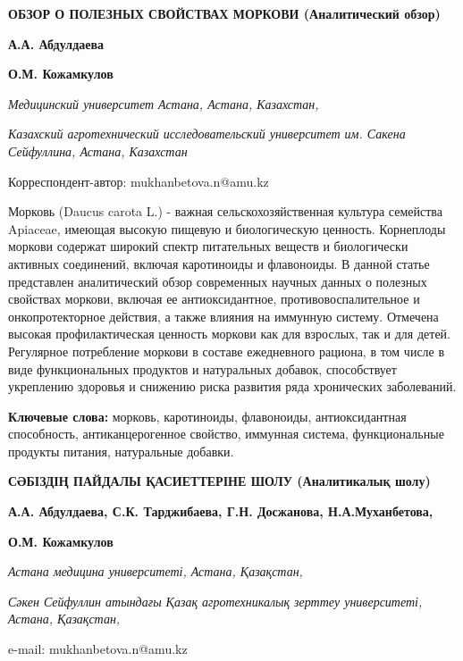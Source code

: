 
{\bfseries ОБЗОР О ПОЛЕЗНЫХ СВОЙСТВАХ МОРКОВИ (Аналитический обзор)}

{\bfseries {}А.А.
Абдулдаева}

{\bfseries {}О.М.
Кожамкулов}

\emph{Медицинский университет Астана, Астана,
Казахстан,}

\emph{Казахский агротехнический исследовательский
университет им. Сакена Сейфуллина, Астана, Казахстан}

\envelope  Корреспондент-автор:
mukhanbetova.n@amu.kz

Морковь (Daucus carota L.) - важная сельскохозяйственная культура
семейства Apiaceae, имеющая высокую пищевую и биологическую ценность.
Корнеплоды моркови содержат широкий спектр питательных веществ и
биологически активных соединений, включая каротиноиды и флавоноиды. В
данной статье представлен аналитический обзор современных научных данных
о полезных свойствах моркови, включая ее антиоксидантное,
противовоспалительное и онкопротекторное действия, а также влияния на
иммунную систему. Отмечена высокая профилактическая ценность моркови как
для взрослых, так и для детей. Регулярное потребление моркови в составе
ежедневного рациона, в том числе в виде функциональных продуктов и
натуральных добавок, способствует укреплению здоровья и снижению риска
развития ряда хронических заболеваний.

{\bfseries Ключевые слова:} морковь, каротиноиды, флавоноиды,
антиоксидантная способность, антиканцерогенное свойство, иммунная
система, функциональные продукты питания, натуральные добавки.

{\bfseries СӘБІЗДІҢ ПАЙДАЛЫ ҚАСИЕТТЕРІНЕ ШОЛУ (Аналитикалық шолу)}

{\bfseries {}А.А. Абдулдаева, С.К.
Тарджибаева, Г.Н. Досжанова,
Н.А.Муханбетова\envelope ,}

{\bfseries {}О.М. Кожамкулов}

\emph{Астана медицина университеті, Астана,
Қазақстан,}

\emph{Сәкен Сейфуллин атындағы Қазақ агротехникалық
зерттеу университеті, Астана, Қазақстан,}

e-mail:
mukhanbetova.n@amu.kz

